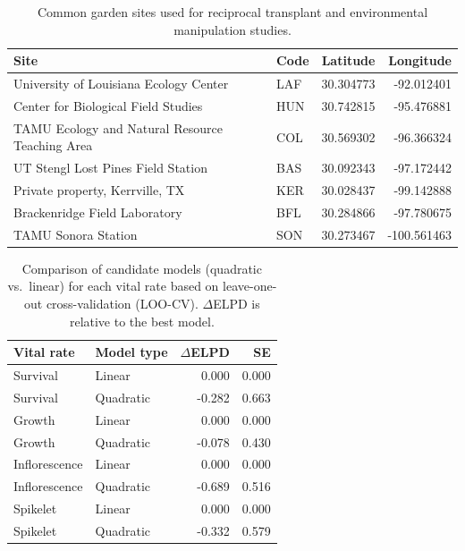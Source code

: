 \documentclass[12pt]{article}\usepackage[]{graphicx}\usepackage[dvipsnames]{xcolor}
\begin{document}
\begin{table}[ht]
\caption{Common garden sites used for reciprocal transplant and environmental manipulation studies.}
\label{tab:exp_sites}
\begin{tabular}{llrr}
\hline
Site & Code & Latitude & Longitude \\
\hline
University of Louisiana Ecology Center           & LAF & 30.304773 & -92.012401 \\
Center for Biological Field Studies              & HUN & 30.742815 & -95.476881 \\
TAMU Ecology and Natural Resource Teaching Area  & COL & 30.569302 & -96.366324 \\
UT Stengl Lost Pines Field Station               & BAS & 30.092343 & -97.172442 \\
Private property, Kerrville, TX                  & KER & 30.028437 & -99.142888 \\
Brackenridge Field Laboratory                    & BFL & 30.284866 & -97.780675 \\
TAMU Sonora Station                              & SON & 30.273467 & -100.561463 \\
\hline
\end{tabular}
\end{table}
\clearpage

\begin{table}[ht]
\centering
\caption{Comparison of candidate models (quadratic vs.\ linear) for each vital rate based on leave-one-out cross-validation (LOO-CV).
$\Delta$ELPD is relative to the best model.}
\label{tab:model_comparison}
\begin{tabular}{llrr}
\hline
Vital rate & Model type & $\Delta$ELPD & SE \\
\hline
Survival      & Linear    & 0.000  & 0.000 \\
Survival      & Quadratic & -0.282 & 0.663 \\
Growth        & Linear    & 0.000  & 0.000 \\
Growth        & Quadratic & -0.078 & 0.430 \\
Inflorescence & Linear    & 0.000  & 0.000 \\
Inflorescence & Quadratic & -0.689 & 0.516 \\
Spikelet      & Linear    & 0.000  & 0.000 \\
Spikelet      & Quadratic & -0.332 & 0.579 \\
\hline
\end{tabular}
\end{table}
\clearpage
\end{document}
